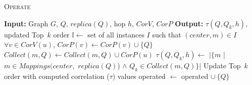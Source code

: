 \begin{algorithm}%
	\caption{\textsc{Operate}}\label{algo:operate}
		\dontprintsemicolon
		\nonl \textbf{Input:} Graph $G$, $Q$, $replica(Q)$, hop $h$, $CorV$, $CorP$\;
		\nonl \textbf{Output:} $\tau({Q,Q_{k},h})$, updated {\sf Top\ $k$} order\;
		{
			$\mathbb{I}\leftarrow$ {set of all instances $I$ such that $(center, m)\in I$}\;
			{
				$\forall v \in CorV(u)$, $CorP(v)\leftarrow CorP(v) \cup \{Q\}$\;
				$Collect(m, Q) \leftarrow Collect(m, Q) \cup CorP(u)$\;	 
			}						
		}
		{
			$\tau(Q, Q_k, h)\leftarrow$  $|\{m$ | $m\in Mappings(center,$ $replica(Q)$) $\wedge$ $Q_k\in Collect(m, Q)\}|$\;
		}
		Update {\sf Top\ $k$} order with computed correlation ($\tau$) values\;
		{\sf operated} $\leftarrow$ {\sf operated} $\cup \ \{Q\}$\;

\end{algorithm}



